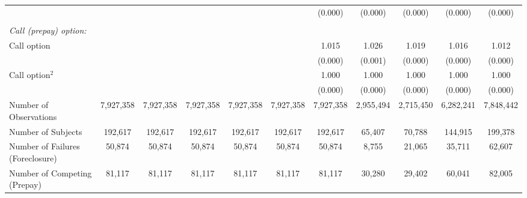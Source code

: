 {\begin{tabular}{l*{10}{c}}
                    &                     &                     &                     &                     &                     &     (0.000)         &     (0.000)         &     (0.000)         &     (0.000)         &     (0.000)         \\
& & & & & \\ 
 \emph{Call (prepay) option:} & & & & & \\ 
Call option         &                     &                     &                     &                     &                     &       1.015\sym{***}&       1.026\sym{***}&       1.019\sym{***}&       1.016\sym{***}&       1.012\sym{***}\\
                    &                     &                     &                     &                     &                     &     (0.000)         &     (0.001)         &     (0.000)         &     (0.000)         &     (0.000)         \\
Call option$^2$     &                     &                     &                     &                     &                     &       1.000\sym{***}&       1.000\sym{***}&       1.000\sym{***}&       1.000\sym{***}&       1.000\sym{***}\\
                    &                     &                     &                     &                     &                     &     (0.000)         &     (0.000)         &     (0.000)         &     (0.000)         &     (0.000)         \\
\hline
Number of Observations&   7,927,358         &   7,927,358         &   7,927,358         &   7,927,358         &   7,927,358         &   7,927,358         &   2,955,494         &   2,715,450         &   6,282,241         &   7,848,442         \\
Number of Subjects  &     192,617         &     192,617         &     192,617         &     192,617         &     192,617         &     192,617         &      65,407         &      70,788         &     144,915         &     199,378         \\
Number of Failures (Foreclosure)&      50,874         &      50,874         &      50,874         &      50,874         &      50,874         &      50,874         &       8,755         &      21,065         &      35,711         &      62,607         \\
Number of Competing (Prepay)&      81,117         &      81,117         &      81,117         &      81,117         &      81,117         &      81,117         &      30,280         &      29,402         &      60,041         &      82,005         \\

\end{tabular}}
